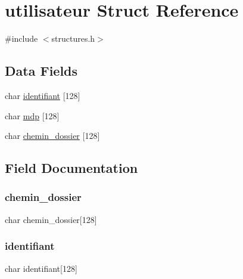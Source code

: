 \hypertarget{structutilisateur}{}\section{utilisateur Struct Reference}
\label{structutilisateur}


{\ttfamily \#include $<$structures.\+h$>$}

\subsection*{Data Fields}
\begin{DoxyCompactItemize}
\item 
char \hyperlink{structutilisateur_aa9f89c9a3512c982fed4d4789019bdb3}{identifiant} \mbox{[}128\mbox{]}
\item 
char \hyperlink{structutilisateur_a8af71e7f7d7c4089896f8f6498d53a22}{mdp} \mbox{[}128\mbox{]}
\item 
char \hyperlink{structutilisateur_a753cd8189e0a1f94f7d7e4d65a343004}{chemin\+\_\+dossier} \mbox{[}128\mbox{]}
\end{DoxyCompactItemize}


\subsection{Field Documentation}
\hypertarget{structutilisateur_a753cd8189e0a1f94f7d7e4d65a343004}{}\label{structutilisateur_a753cd8189e0a1f94f7d7e4d65a343004} 
\subsubsection{\texorpdfstring{chemin\+\_\+dossier}{chemin\_dossier}}
{\footnotesize\ttfamily char chemin\+\_\+dossier\mbox{[}128\mbox{]}}

\hypertarget{structutilisateur_aa9f89c9a3512c982fed4d4789019bdb3}{}\label{structutilisateur_aa9f89c9a3512c982fed4d4789019bdb3} 
\subsubsection{\texorpdfstring{identifiant}{identifiant}}
{\footnotesize\ttfamily char identifiant\mbox{[}128\mbox{]}}

